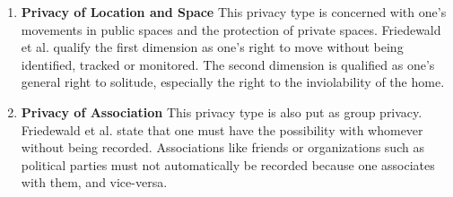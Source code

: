 \documentclass[runningheads,a4paper]{llncs}
\begin{document}
\begin{enumerate}
\item \textbf{Privacy of Location and Space}
This privacy type is concerned with one's movements in public spaces and the protection of private spaces.
Friedewald et al. qualify the first dimension as one's right to move without being identified, tracked or monitored.
The second dimension is qualified as one's general right to solitude, especially the right to the inviolability of the home.


\item \textbf{Privacy of Association}
This privacy type is also put as group privacy.
Friedewald et al. state that one must have the possibility with whomever without being recorded.
Associations like friends or organizations such as political parties must not automatically be recorded because one associates with them, and vice-versa.
\end{enumerate}
\end{document}

